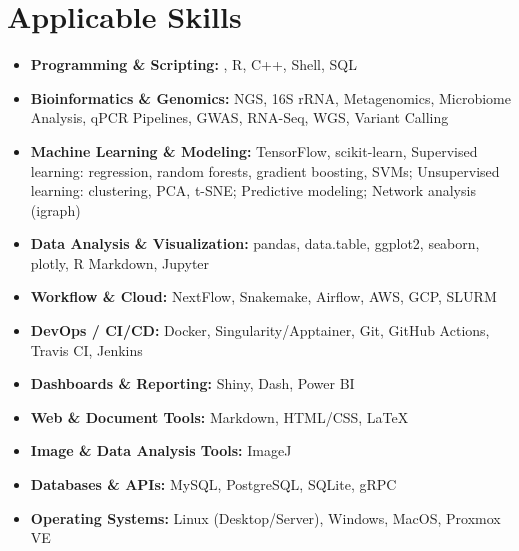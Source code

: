 
\section*{Applicable Skills}

\begin{itemize}[left=0cm, itemsep=0.1cm, label={}]
  \item \textbf{Programming \& Scripting:} \mbox{}, R, C++, Shell, SQL
  \item \textbf{Bioinformatics \& Genomics:} NGS, 16S rRNA, Metagenomics, Microbiome Analysis, qPCR Pipelines, GWAS, RNA-Seq, WGS, Variant Calling
  \item \textbf{Machine Learning \& Modeling:} TensorFlow, scikit-learn, Supervised learning: regression, random forests, gradient boosting, SVMs; Unsupervised learning: clustering, PCA, t-SNE; Predictive modeling; Network analysis (igraph)
  \item \textbf{Data Analysis \& Visualization:} pandas, data.table, ggplot2, seaborn, plotly, R Markdown, Jupyter
  \item \textbf{Workflow \& Cloud:} NextFlow, Snakemake, Airflow, AWS, GCP, SLURM
  \item \textbf{DevOps / CI/CD:} Docker, Singularity/Apptainer, Git, GitHub Actions, Travis CI, Jenkins
  \item \textbf{Dashboards \& Reporting:} Shiny, Dash, Power BI
  \item \textbf{Web \& Document Tools:} Markdown, HTML/CSS, \LaTeX
  \item \textbf{Image \& Data Analysis Tools:} ImageJ
  \item \textbf{Databases \& APIs:} MySQL, PostgreSQL, SQLite, gRPC
  \item \textbf{Operating Systems:} Linux (Desktop/Server), Windows, MacOS, Proxmox VE
\end{itemize}




